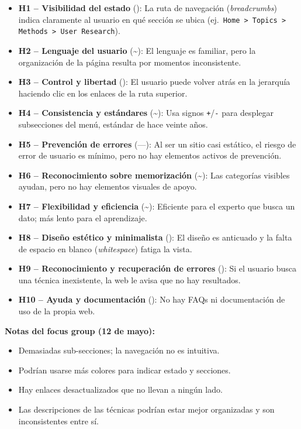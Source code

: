 \documentclass[12pt, a4paper]{report}
\begin{document}
\begin{itemize}
  \item \textbf{H1 – Visibilidad del estado} (\checkmark): La ruta de navegación
    (\textit{breadcrumbs}) indica claramente al usuario en qué sección se ubica
    (ej.\ \texttt{Home > Topics > Methods > User Research}).
  \item \textbf{H2 – Lenguaje del usuario} (\textasciitilde): El lenguaje es familiar, pero la
    organización de la página resulta por momentos inconsistente.
  \item \textbf{H3 – Control y libertad} (\checkmark): El usuario puede volver atrás en la
    jerarquía haciendo clic en los enlaces de la ruta superior.
  \item \textbf{H4 – Consistencia y estándares} (\textasciitilde): Usa signos \texttt{+}/\texttt{-}
    para desplegar subsecciones del menú, estándar de hace veinte años.
  \item \textbf{H5 – Prevención de errores} (—): Al ser un sitio casi estático, el riesgo de
    error de usuario es mínimo, pero no hay elementos activos de prevención.
  \item \textbf{H6 – Reconocimiento sobre memorización} (\textasciitilde): Las categorías
    visibles ayudan, pero no hay elementos visuales de apoyo.
  \item \textbf{H7 – Flexibilidad y eficiencia} (\textasciitilde): Eficiente para el experto que
    busca un dato; más lento para el aprendizaje.
  \item \textbf{H8 – Diseño estético y minimalista} (\texttimes): El diseño es anticuado y la
    falta de espacio en blanco (\textit{whitespace}) fatiga la vista.
  \item \textbf{H9 – Reconocimiento y recuperación de errores} (\checkmark): Si el usuario
    busca una técnica inexistente, la web le avisa que no hay resultados.
  \item \textbf{H10 – Ayuda y documentación} (\texttimes): No hay FAQs ni documentación
    de uso de la propia web.
\end{itemize}

\textbf{Notas del focus group (12 de mayo):}
\begin{itemize}
  \item Demasiadas sub-secciones; la navegación no es intuitiva.
  \item Podrían usarse más colores para indicar estado y secciones.
  \item Hay enlaces desactualizados que no llevan a ningún lado.
  \item Las descripciones de las técnicas podrían estar mejor organizadas y son inconsistentes entre sí.
\end{itemize}
\end{document}
